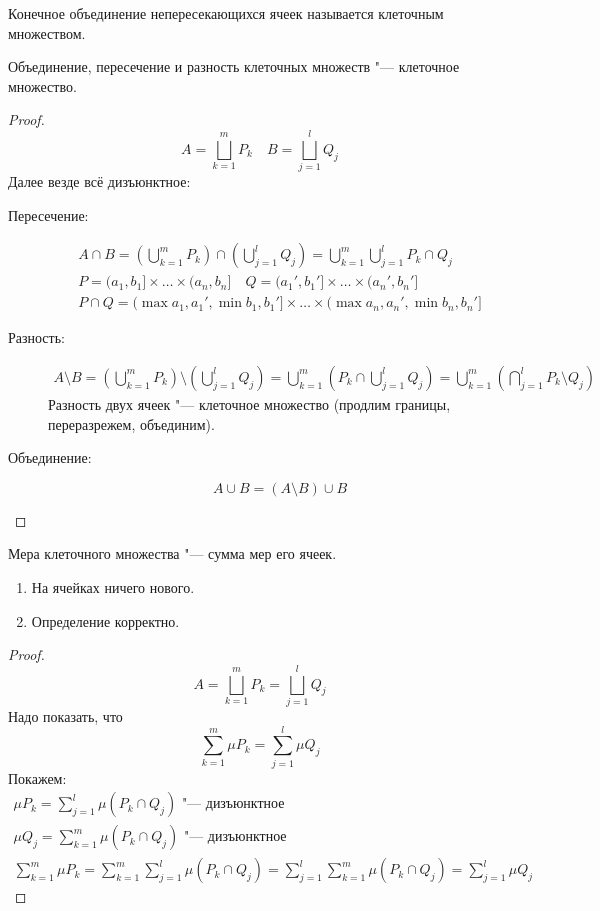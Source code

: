 \begin{Def}
	Конечное объединение непересекающихся ячеек называется клеточным множеством.
\end{Def}
\begin{lemma}
	Объединение, пересечение и разность клеточных множеств "--- клеточное множество.
\end{lemma}
\begin{proof}
	\[ A = \bigsqcup_{k=1}^m P_k \quad B = \bigsqcup_{j=1}^l Q_j \]
	Далее везде всё дизъюнктное:
	\begin{description}
	\item[Пересечение:]
		\begin{gather*}
			A \cap B = \left(\bigcup_{k=1}^m P_k\right) \cap \left(\bigcup_{j=1}^l Q_j\right)
				= \bigcup_{k=1}^m \bigcup_{j=1}^l P_k \cap Q_j \\
			P = (a_1, b_1] \times \dots \times (a_n, b_n] \quad Q = (a_1', b_1'] \times \dots \times (a_n', b_n'] \\
			P \cap Q = (\max{a_1, a_1'}, \min{b_1, b_1'}] \times \dots \times (\max{a_n, a_n'}, \min{b_n, b_n'}]
		\end{gather*}

	\item[Разность:]
		\begin{gather*}
			A \setminus B = \left(\bigcup_{k=1}^m P_k\right) \setminus \left(\bigcup_{j=1}^l Q_j\right)
				= \bigcup_{k=1}^m \left( P_k \cap \bigcup_{j=1}^l Q_j \right) = \bigcup_{k=1}^m \left( \bigcap_{j=1}^l P_k \setminus Q_j \right)
		\end{gather*}
		Разность двух ячеек "--- клеточное множество (продлим границы, переразрежем, объединим).

	\item[Объединение:]
		\[ A \cup B = (A \setminus B) \cup B \]
	\end{description}
\end{proof}

\begin{Def}
	Мера клеточного множества "--- сумма мер его ячеек.
\end{Def}
\begin{assertion}
	\begin{enumerate}
		\item На ячейках ничего нового.
		\item Определение корректно.
	\end{enumerate}
\end{assertion}
\begin{proof}
	\[ A = \bigsqcup_{k=1}^m P_k = \bigsqcup_{j=1}^l Q_j \]
	Надо показать, что
	\[ \sum_{k=1}^m \mu P_k = \sum_{j=1}^l \mu Q_j \]
	Покажем:
	\begin{gather*}
		\mu P_k = \sum_{j=1}^l \mu (P_k \cap Q_j) \text{ "--- дизъюнктное} \\
		\mu Q_j = \sum_{k=1}^m \mu (P_k \cap Q_j) \text{ "--- дизъюнктное} \\
		\sum_{k=1}^m \mu P_k = \sum_{k=1}^m \sum_{j=1}^l \mu (P_k \cap Q_j)
			= \sum_{j=1}^l \sum_{k=1}^m \mu (P_k \cap Q_j) = \sum_{j=1}^l \mu Q_j
	\end{gather*}
\end{proof}
